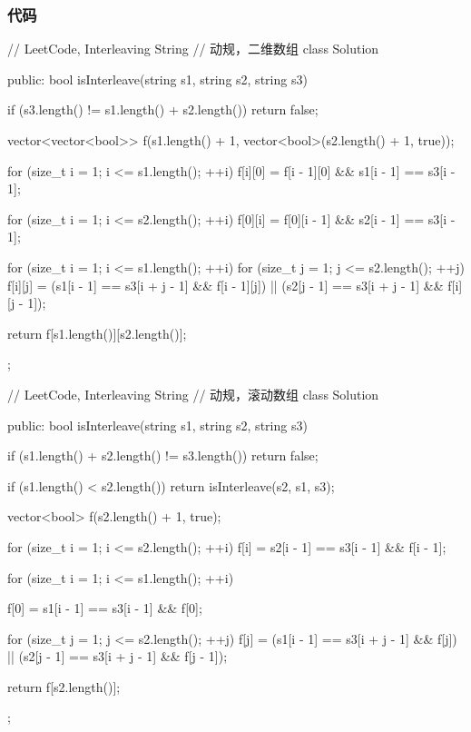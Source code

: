 \subsubsection{代码}
\begin{Code}
// LeetCode, Interleaving String
// 动规，二维数组
class Solution {
public:
    bool isInterleave(string s1, string s2, string s3) {
        if (s3.length() != s1.length() + s2.length())
            return false;

        vector<vector<bool>> f(s1.length() + 1,
                vector<bool>(s2.length() + 1, true));

        for (size_t i = 1; i <= s1.length(); ++i)
            f[i][0] = f[i - 1][0] && s1[i - 1] == s3[i - 1];

        for (size_t i = 1; i <= s2.length(); ++i)
            f[0][i] = f[0][i - 1] && s2[i - 1] == s3[i - 1];

        for (size_t i = 1; i <= s1.length(); ++i)
            for (size_t j = 1; j <= s2.length(); ++j)
                f[i][j] = (s1[i - 1] == s3[i + j - 1] && f[i - 1][j])
                        || (s2[j - 1] == s3[i + j - 1] && f[i][j - 1]);

        return f[s1.length()][s2.length()];
    }
};
\end{Code}

\begin{Code}
// LeetCode, Interleaving String
// 动规，滚动数组
class Solution {
public:
    bool isInterleave(string s1, string s2, string s3) {
        if (s1.length() + s2.length() != s3.length())
            return false;

        if (s1.length() < s2.length())
            return isInterleave(s2, s1, s3);

        vector<bool> f(s2.length() + 1, true);

        for (size_t i = 1; i <= s2.length(); ++i)
            f[i] = s2[i - 1] == s3[i - 1] && f[i - 1];

        for (size_t i = 1; i <= s1.length(); ++i) {
            f[0] = s1[i - 1] == s3[i - 1] && f[0];

            for (size_t j = 1; j <= s2.length(); ++j)
                f[j] = (s1[i - 1] == s3[i + j - 1] && f[j])
                        || (s2[j - 1] == s3[i + j - 1] && f[j - 1]);
        }

        return f[s2.length()];
    }
};
\end{Code}

